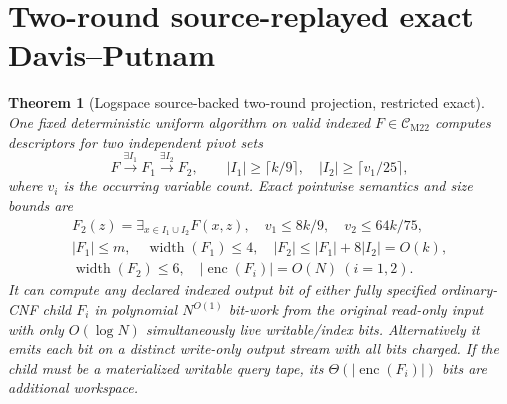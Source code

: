 \documentclass[11pt]{article}
\newtheorem{theorem}{Theorem}
\newcommand{\CM}{\mathcal C_{\mathrm{M22}}}
\begin{document}
\section{Two-round source-replayed exact Davis--Putnam}
\begin{theorem}[Logspace source-backed two-round projection, restricted exact]
One fixed deterministic uniform algorithm on valid indexed $F\in\CM$ computes descriptors for two independent pivot sets
\[
F\xrightarrow{\exists I_1}F_1\xrightarrow{\exists I_2}F_2,\qquad
|I_1|\ge\lceil k/9\rceil,\quad
|I_2|\ge\lceil v_1/25\rceil,
\]
where $v_i$ is the \emph{occurring} variable count. Exact pointwise semantics and size bounds are
\[
\begin{gathered}
F_2(z)=\exists_{x\in I_1\cup I_2}F(x,z),\quad
v_1\le8k/9,\quad v_2\le64k/75,\\
|F_1|\le m,\quad\operatorname{width}(F_1)\le4,\quad
|F_2|\le |F_1|+8|I_2|=O(k),\\
\operatorname{width}(F_2)\le6,\quad
|\operatorname{enc}(F_i)|=O(N)\ (i=1,2).
\end{gathered}
\]
It can compute any declared indexed output bit of either fully specified ordinary-CNF child $F_i$ in polynomial $N^{O(1)}$ bit-work from the original \emph{read-only} input with only $O(\log N)$ simultaneously live writable/index bits. Alternatively it emits each bit on a distinct \emph{write-only output stream} with all bits charged. If the child must be a materialized writable query tape, its $\Theta(|\operatorname{enc}(F_i)|)$ bits are \emph{additional} workspace.
\end{theorem}
\end{document}
